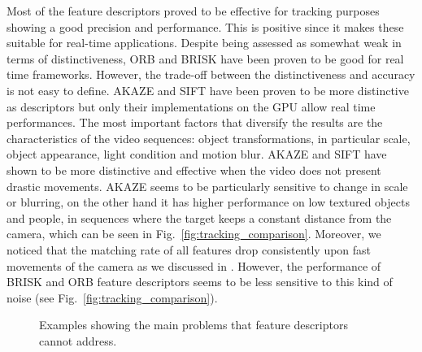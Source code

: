 Most of the feature descriptors proved to be effective for tracking purposes showing a good precision and performance. This is positive since it makes these suitable for real-time applications. Despite being assessed as somewhat weak in terms of distinctiveness, ORB and BRISK have been proven to be good for real time frameworks. 
However, the trade-off between the distinctiveness and accuracy is not easy to define.
AKAZE and SIFT have been proven to be more distinctive as descriptors but only their implementations on the GPU allow real time performances. 
The most important factors that diversify the results are the characteristics of the video sequences: object transformations, in particular scale, object appearance, light condition and motion blur. AKAZE and SIFT have shown to be more distinctive and effective when the video does not present drastic movements. AKAZE seems to be particularly sensitive to change in scale or blurring, on the other hand it has higher performance on low textured objects and people, in sequences where the target keeps a constant distance from the camera, which can be seen in Fig.~\ref{fig:tracking_comparison}.
Moreover, we noticed that the matching rate of all features drop consistently upon fast movements of the camera as we discussed in \cite{pieropan15}. However, the performance of BRISK and ORB feature descriptors seems to be less sensitive to this kind of noise (see Fig.~\ref{fig:tracking_comparison}).

\begin{figure}[!htb]
	\vspace{2mm}
\centerline{%
	}
	\vspace{-2mm}
\caption{Examples showing the main problems that feature descriptors cannot address. }
\label{fig:tracking_results_scale}
\end{figure} 


